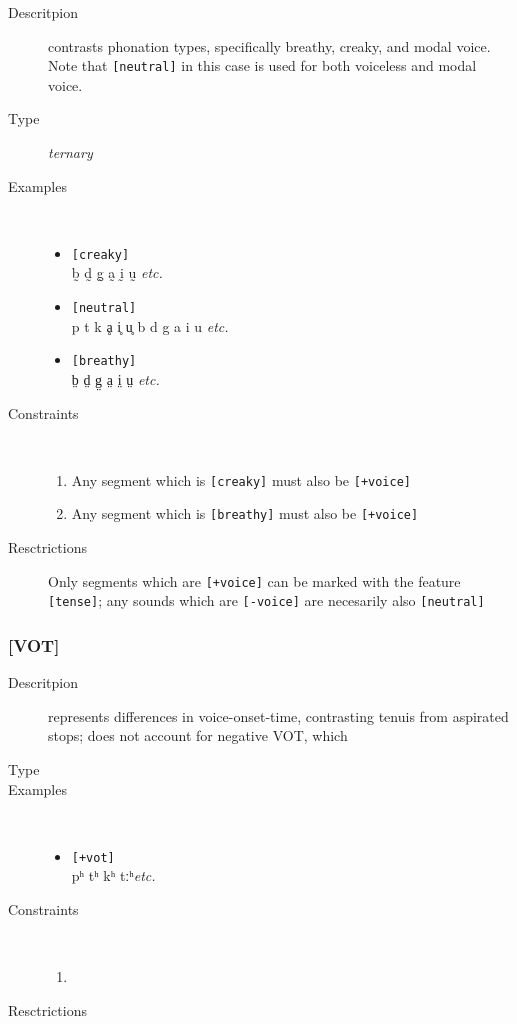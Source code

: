 \documentclass[10pt,letterpaper]{article}
\begin{document}
\begin{description}
\item[Descritpion] contrasts phonation types, specifically breathy, creaky, and modal voice. Note that \texttt{[neutral]} in this case is used for both voiceless and modal voice.

\item[Type] \emph{ternary}
\item[Examples]\
  \begin{itemize}
    \item \texttt{[creaky]}\\
    b̰ d̰ g̰ a̰ ḭ ṵ \emph{etc.}
    \item \texttt{[neutral]}\\
    p t k ḁ i̥ u̥ b d g a i u \emph{etc.}
    \item \texttt{[breathy]}\\
    b̤ d̤ g̤ a̤ i̤ ṳ \emph{etc.}
  \end{itemize}
\item[Constraints]\
  \begin{enumerate}
    \item Any segment which is \texttt{[creaky]} must also be \texttt{[+voice]}
    \item Any segment which is \texttt{[breathy]} must also be \texttt{[+voice]}
  \end{enumerate}
\item[Resctrictions] Only segments which are \texttt{[+voice]} can be marked with the feature \texttt{[tense]}; any sounds which are \texttt{[-voice]} are necesarily also \texttt{[neutral]} 
\end{description}

\subsubsection{[VOT]}
\label{ssub:feature_vot}

\begin{description}
\item[Descritpion] represents differences in voice-onset-time, contrasting tenuis from aspirated stops; does not account for negative VOT, which
\item[Type]
\item[Examples]\
  \begin{itemize}
    \item \texttt{[+vot]}\\
    pʰ tʰ kʰ tːʰ\emph{etc.}
  \end{itemize}
\item[Constraints]\
  \begin{enumerate}
    \item
  \end{enumerate}
\item[Resctrictions]
\end{description}
\end{document}
